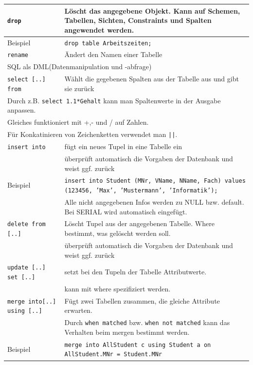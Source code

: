 \documentclass{article}
\begin{document}
\begin{center}
\begin{longtable}{|p{4cm}|p{7cm}|}
    \hline
    \texttt{drop} & Löscht das angegebene Objekt. Kann auf Schemen, Tabellen, Sichten, Constraints und Spalten angewendet werden. \\
    \hline
    Beispiel & \texttt{drop table Arbeitszeiten;} \\
    \hline
    \texttt{rename} & Ändert den Namen einer Tabelle \\
    \hline
    \multicolumn{2}{|p{11cm}|}{SQL als DML(Datenmanipulation und -abfrage)} \\
    \hline
    \texttt{select [..] from} & Wählt die gegebenen Spalten aus der Tabelle aus und gibt sie zurück \\
    \hline
    \multicolumn{2}{|p{11cm}|}{Durch z.B. \texttt{select 1.1*Gehalt} kann man Spaltenwerte in der Ausgabe anpassen.} \\
    \multicolumn{2}{|p{11cm}|}{Gleiches funktioniert mit +,- und / auf Zahlen.} \\
    \multicolumn{2}{|p{11cm}|}{Für Konkatinieren von Zeichenketten verwendet man \texttt{||}.} \\
    \hline
    \texttt{insert into} & fügt ein neues Tupel in eine Tabelle ein \\
    & überprüft automatisch die Vorgaben der Datenbank und weist ggf. zurück \\
    \hline
    Beispiel & \texttt{insert into Student (MNr, VName, NName, Fach) values (123456, 'Max', 'Mustermann', 'Informatik');} \\
    & Alle nicht angegebenen Infos werden zu NULL bzw. default. Bei SERIAL wird automatisch eingefügt. \\
    \hline
    \texttt{delete from [..]} & Löscht Tupel aus der angegebenen Tabelle. Where bestimmt, was gelöscht werden soll. \\
    & überprüft automatisch die Vorgaben der Datenbank und weist ggf. zurück \\
    \hline
    \texttt{update [..] set [..]} & setzt bei den Tupeln der Tabelle Attributwerte. \\
    &  kann mit where spezifiziert werden. \\
    \hline
    \texttt{merge into[..] using [..]} & Fügt zwei Tabellen zusammen, die gleiche Attribute erwarten. \\
    &  Durch \texttt{when matched} bzw. \texttt{when not matched} kann das Verhalten beim mergen bestimmt werden. \\
    \hline
    Beispiel & \texttt{merge into AllStudent c using Student a on AllStudent.MNr = Student.MNr} \\

\end{longtable}
\end{center}
\end{document}
